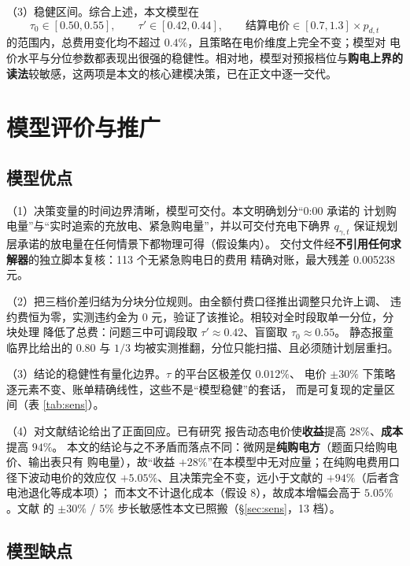 \documentclass[withoutpreface]{cumcmthesis}
\renewcommand{\emph}[1]{\textbf{#1}}
\begin{document}
\noindent（3）稳健区间。综合上述，本文模型在
\[
\tau_0\in[0.50,0.55],\qquad \tau'\in[0.42,0.44],\qquad
\text{结算电价}\in[0.7,1.3]\times p_{d,t}
\]
的范围内，总费用变化均不超过 $0.4\%$，且策略在电价维度上完全不变；模型对
电价水平与分位参数都表现出很强的稳健性。相对地，模型对预报档位与\emph{购电上界的
读法}较敏感，这两项是本文的核心建模决策，已在正文中逐一交代。

\section{模型评价与推广}
\label{sec:eval}

\subsection{模型优点}

\noindent（1）决策变量的时间边界清晰，模型可交付。本文明确划分“0:00 承诺的
计划购电量”与“实时追索的充放电、紧急购电量”，并以可交付充电下确界
$q_{\gamma,t}$ 保证规划层承诺的放电量在任何情景下都物理可得（假设集内）。
交付文件经\emph{不引用任何求解器}的独立脚本复核：113 个无紧急购电日的费用
精确对账，最大残差 0.005238 元。

\noindent（2）把三档价差归结为分块分位规则。由全额付费口径推出调整只允许上调、
违约费恒为零，实测违约金为 0 元，验证了该推论。相较对全时段取单一分位，分块处理
降低了总费：问题三中可调段取 $\tau'\approx0.42$、盲窗取 $\tau_0\approx0.55$。
静态报童临界比给出的 $0.80$ 与 $1/3$ 均被实测推翻，分位只能扫描、且必须随计划层重扫。

\noindent（3）结论的稳健性有量化边界。$\tau$ 的平台区极差仅 $0.012\%$、
电价 $\pm30\%$ 下策略逐元素不变、账单精确线性，这些不是“模型稳健”的套话，
而是可复现的定量区间（表 \ref{tab:sens}）。

\noindent（4）对文献结论给出了正面回应。已有研究
\cite{parra2016} 报告动态电价使\emph{收益}提高 $28\%$、\emph{成本}提高 $94\%$。
本文的结论与之不矛盾而落点不同：微网是\emph{纯购电方}（题面只给购电价、输出表只有
购电量），故“收益 $+28\%$”在本模型中无对应量；在纯购电费用口径下波动电价的效应仅
$+5.05\%$、且决策完全不变，远小于文献的 $+94\%$（后者含电池退化等成本项）；
而本文不计退化成本（假设 8），故成本增幅会高于 $5.05\%$。文献 \cite{parra2016} 的
$\pm30\%$ / $5\%$ 步长敏感性本文已照搬（\S\ref{sec:sens}，13 档）。

\subsection{模型缺点}
\label{sec:shortfall}
\end{document}
